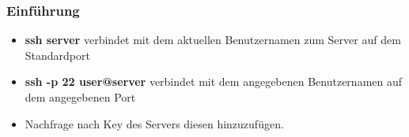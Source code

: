 \begin{frame}
\frametitle{Einführung}
\begin{itemize}
\item \textbf{ssh server} verbindet mit dem aktuellen Benutzernamen zum Server auf dem Standardport
\pause
\item \textbf{ssh -p 22 user@server} verbindet mit dem angegebenen Benutzernamen auf dem angegebenen Port
\pause
\item Nachfrage nach Key des Servers diesen hinzuzufügen.
\end{itemize}
\end{frame}